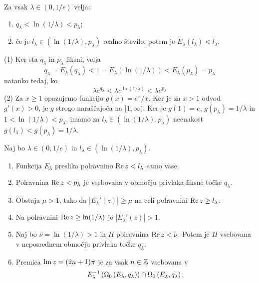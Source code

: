 \begin{lema} \label{lem:enadva}
    Za vsak \(\lambda \in (0, 1/e)\) velja:
    \begin{enumerate}[label=(\arabic*)]
        \item \(q_\lambda < \ln (1 / \lambda) < p_\lambda\);
        \item če je \(l_\lambda \in (\ln (1 / \lambda), p_\lambda)\) realno število, potem je \(E_\lambda (l_\lambda) < l_\lambda\).
    \end{enumerate}
\end{lema}

\begin{dokaz}
    (1) Ker sta \(q_\lambda\) in \(p_\lambda\) fiksni, velja
    \[q_\lambda = E_\lambda (q_\lambda) < 1 = E_\lambda (\ln (1 / \lambda)) < E_\lambda (p_\lambda) = p_\lambda\]
    natanko tedaj, ko
    \[\lambda e^{q_\lambda} < \lambda e^{\ln (1 / \lambda)} < \lambda e^{p_\lambda}\]
    (2) Za \(x \geq 1\) opazujemo funkcijo \(g (x) = e^x / x\). Ker je za \(x > 1\) odvod \(g' (x) > 0\), je \(g\) strogo naraščajoča na \([1, \infty)\). Ker je \(g (1) = e\), \(g (p_\lambda) = 1 / \lambda\) in \(1 < \ln (1 / \lambda) < p_\lambda\), imamo za \(l_\lambda \in (\ln (1 / \lambda), p_\lambda)\) neenakost \(g (l_\lambda) < g (p_\lambda) = 1 / \lambda\).
\end{dokaz}

\begin{trditev} \label{prop:trinajst}
    Naj bo \(\lambda \in (0, 1/e)\) in \(l_\lambda \in (\ln (1 / \lambda), p_\lambda)\).
    \begin{enumerate}[label=(\arabic*)]
        \item Funkcija \(E_\lambda\) preslika polravnino \(\operatorname{Re} z < l_\lambda\) samo vase.
        \item Polravnina \(\operatorname{Re} z < p_\lambda\) je vsebovana v območju privlaka fiksne točke \(q_\lambda\).
        \item Obstaja \(\mu > 1\), tako da \(|E_\lambda' (z)| \geq \mu\) na celi polravnini \(\operatorname{Re} z \geq l_\lambda\).
        \item Na polravnini \(\operatorname{Re} z \geq \ln (1 / \lambda)\) je \(|E_\lambda' (z)| > 1\).
        \item Naj bo \(\nu = \ln (1 / \lambda) > 1\) in \(H\) polravnina \(\operatorname{Re} z < \nu\). Potem je \(H\) vsebovana v neposrednem območju privlaka točke \(q_\lambda\).
        \item Premica \(\operatorname{Im} z = (2n + 1) \pi\) je za vsak \(n \in \mathbb Z\) vsebovana v
              \[E_\lambda^{-1} \left( \Omega_0 \left( E_\lambda, q_\lambda \right) \right) \cap \Omega_0 \left( E_\lambda, q_\lambda \right).\]
    \end{enumerate}
\end{trditev}

